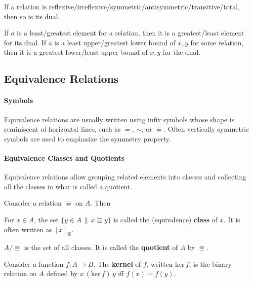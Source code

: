 \begin{theorem}
If a relation is reflexive/irreflexive/symmetric/antisymmetric/transitive/total, then so is its dual.

If $a$ is a least/greatest element for a relation, then it is a greatest/least element for its dual.
If $a$ is a least upper/greatest lower bound of $x,y$ for some relation, then it is a greatest lower/least upper bound of $x,y$ for the dual.
\end{theorem}

\subsection{Equivalence Relations}

\paragraph{Symbols}
Equivalence relations are usually written using infix symbols whose shape is reminiscent of horizontal lines, such as $=$, $\sim$, or $\Equiv$.
Often vertically symmetric symbols are used to emphasize the symmetry property.

\paragraph{Equivalence Classes and Quotients}
Equivalence relations allow grouping related elements into classes and collecting all the classes in what is called a quotient.

\begin{definition}[Quotient]
Consider a relation $\Equiv$ on $A$.
Then
\begin{compactitem}
 \item For $x\in A$, the set $\{y\in A\,\|\,x\Equiv y\}$ is called the (equivalence) \textbf{class} of $x$.
  It is often written as $[x]_\Equiv$.
 \item $A/\Equiv$ is the set of all classes.
  It is called the \textbf{quotient} of $A$ by $\Equiv$.
\end{compactitem}
\end{definition}

\begin{definition}[Kernel]
Consider a function $f:A\to B$. The \textbf{kernel} of $f$, written $\mathrm{ker}\, f$, is the binary relation on $A$ defined by $x\,(\mathrm{ker}\, f)\,y$ iff $f(x)=f(y)$.
\end{definition}

